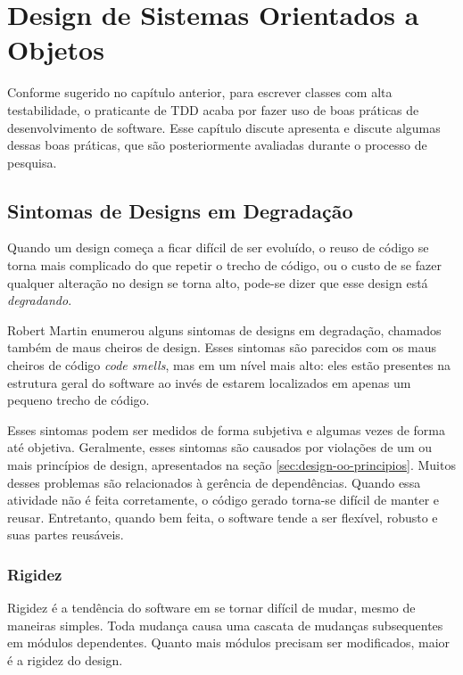 \chapter{Design de Sistemas Orientados a Objetos}
\label{cap:design}

Conforme sugerido no capítulo anterior, para escrever classes com alta
testabilidade, o praticante de TDD acaba por fazer uso de boas práticas de
desenvolvimento de software. 
Esse capítulo discute apresenta e discute algumas dessas boas práticas, que
são posteriormente avaliadas durante o processo de pesquisa.

\section{Sintomas de Designs em Degradação}
\label{sec:design-degradacao}

Quando um design começa a ficar difícil de ser evoluído, o reuso de código se 
torna mais complicado do que repetir o trecho de código, ou o custo de se fazer 
qualquer alteração no design se torna alto, pode-se dizer que esse design
está \textit{degradando}. 

Robert Martin \cite{bob-martin} enumerou alguns sintomas de designs em degradação, 
chamados também de maus cheiros de design. Esses sintomas são parecidos com os 
maus cheiros de código \textit{code smells}, mas em um nível mais alto: eles
estão presentes na estrutura geral do software ao invés de estarem localizados
em apenas um pequeno trecho de código.

Esses sintomas podem ser medidos de forma subjetiva e algumas vezes de forma 
até objetiva. Geralmente, esses sintomas são causados por violações de um ou 
mais princípios de design, apresentados na seção \ref{sec:design-oo-principios}.
Muitos desses problemas são relacionados à gerência de dependências. Quando essa
atividade não é feita corretamente, o código gerado torna-se difícil de manter e
reusar. Entretanto, quando bem feita, o software tende a ser flexível, robusto 
e suas partes reusáveis.

\subsection{Rigidez}
\label{subsec:rigidez}

Rigidez é a tendência do software em se tornar difícil de mudar, mesmo de 
maneiras simples. Toda mudança causa uma cascata de mudanças subsequentes  em
módulos dependentes. Quanto mais módulos precisam ser modificados, maior é a
rigidez do design. 

